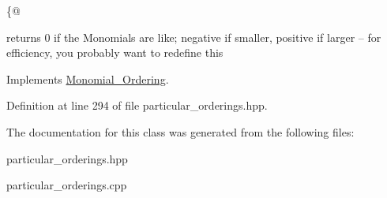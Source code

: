 \{@ 

returns 0 if the Monomials are like; negative if smaller, positive if larger -- for efficiency, you probably want to redefine this 

Implements \hyperlink{class_monomial___ordering_a9bc3155fc98b4d40c26118fa2114b827}{Monomial\+\_\+\+Ordering}.



Definition at line 294 of file particular\+\_\+orderings.\+hpp.



The documentation for this class was generated from the following files\+:\begin{DoxyCompactItemize}
\item 
particular\+\_\+orderings.\+hpp\item 
particular\+\_\+orderings.\+cpp\end{DoxyCompactItemize}
